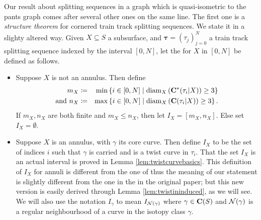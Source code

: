 Our result about splitting sequences in a graph which is quasi-isometric to the pants graph comes after several other ones on the same line. The first one is a \emph{structure theorem} for cornered train track splitting sequences. We state it in a slighty altered way. Given $X\subseteq S$ a subsurface, and $\bm\tau=(\tau_j)_{j=0}^N$ a train track splitting sequence indexed by the interval $[0,N]$, let the  for $X$ in $[0,N]$ be defined as follows.
\begin{itemize}
\item Suppose $X$ is not an annulus. Then define 
\begin{eqnarray*}
  m_X & \coloneqq &\min\left\{i\in [0,N]\mid \mathrm{diam}_X\left(\mathbf C^*(\tau_i|X)\right)\geq 3\right\} \\
\text{and } n_X & \coloneqq & \max\left\{i\in [0,N]\mid \mathrm{diam}_X\left(\mathbf C(\tau_i|X)\right)\geq 3\right\}.
\end{eqnarray*}
 If $m_X,n_X$ are both finite and $m_X\leq n_X$, then let $I_X=[m_X,n_X]$. Else set $I_X=\emptyset$.
\item Suppose $X$ is an annulus, with $\gamma$ its core curve. Then define $I_X$ to be the set of indices $i$ such that $\gamma$ is carried and is a twist curve in $\tau_i$. That the set $I_X$ is an actual interval is proved in Lemma \ref{lem:twistcurvebasics}. This definition of $I_X$ for annuli is different from the one of \cite{mms} thus the meaning of our statement is slightly different from the one in the in the original paper; but this new version is easily derived through Lemma \ref{lem:twistininduced}, as we will see. We will also use the notation $I_\gamma$ to mean $I_{{\mathcal N}(\gamma)}$ where $\gamma\in\mathbf C(S)$ and ${\mathcal N}(\gamma)$ is a regular neighbourhood of a curve in the isotopy class $\gamma$.
\end{itemize}

